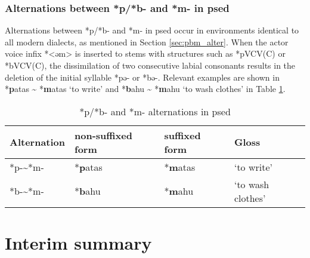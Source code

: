 \subsubsection{Alternations between *p/*b- and *m- in \acl{psed}}

Alternations between *p/*b- and *m- in \acl{psed} occur in environments identical to all modern dialects, as mentioned in Section \ref{sec:pbm_alter}. When the actor voice infix *<əm> is inserted to stems with structures such as *pVCV(C) or *bVCV(C), the dissimilation of two consecutive labial consonants results in the deletion of the initial syllable *pə- or *bə-. Relevant examples are shown in *\textbf{p}atas \~{} *\textbf{m}atas `to write' and *\textbf{b}ahu \~{} *\textbf{m}ahu `to wash clothes' in Table \ref{tab:psed_bp2m}.

\begin{table}[!htbp]
\centering
\caption{*p/*b- and *m- alternations in \acl{psed}}
\label{tab:psed_bp2m}
\begin{tabular}{llll}
\hline
Alternation  & non-suffixed form  & suffixed form & Gloss                   \\ \hline
*p-\~{ }*m-  & *\textbf{p}atas & *\textbf{m}atas   & `to write'               \\
*b-\~{ }*m-  & *\textbf{b}ahu  & *\textbf{m}ahu     & `to wash clothes' \\ \hline
\end{tabular}
\end{table}

\section{Interim summary}
\lipsum[1-4]
